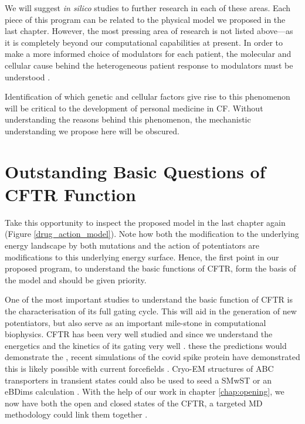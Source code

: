 We will suggest \textit{in silico} studies to further research in each of these areas. Each piece of this program can be related to the physical model we proposed in the last chapter. However, the most pressing area of research is not listed above---as it is completely beyond our computational capabilities at present. In order to make a more informed choice of modulators for each patient, the molecular and cellular cause behind the heterogeneous patient response to modulators must be understood \cite{hanafin2021}. 

Identification of which genetic and cellular factors give rise to this phenomenon will be critical to the development of personal medicine in CF. Without understanding the reasons behind this phenomenon, the mechanistic understanding we propose here will be obscured. 

\section{Outstanding Basic Questions of CFTR Function}
Take this opportunity to inspect the proposed model in the last chapter again (Figure \ref{drug_action_model}). Note how both the modification to the underlying energy landscape by both  mutations and the action of potentiators are modifications to this underlying energy surface. Hence, the first point in our proposed program, to understand the basic functions of CFTR, form the basis of the model and should be given priority.


One of the most important studies to understand the basic function of CFTR is the characterisation of its full gating cycle. This will aid in the generation of new potentiators, but also serve as an important mile-stone in computational biophysics. CFTR has been very well studied and since we understand the energetics and the kinetics of its gating very well \cite{csanady2017}.  these the predictions would demonstrate the , recent simulations of the covid spike protein have demonstrated this is likely possible with current forcefields \cite{casalino2021}. Cryo-EM structures of ABC transporters in transient states could also be used to seed a SMwST or an eBDims calculation \cite{hofmann2019, orellana2016, roux2021, pan2008}. With the help of our work in chapter \ref{chap:opening}, we now have both the open and closed states of the CFTR, a targeted MD methodology could link them together \cite{zhang2018, liu2017, moradi2015}.

